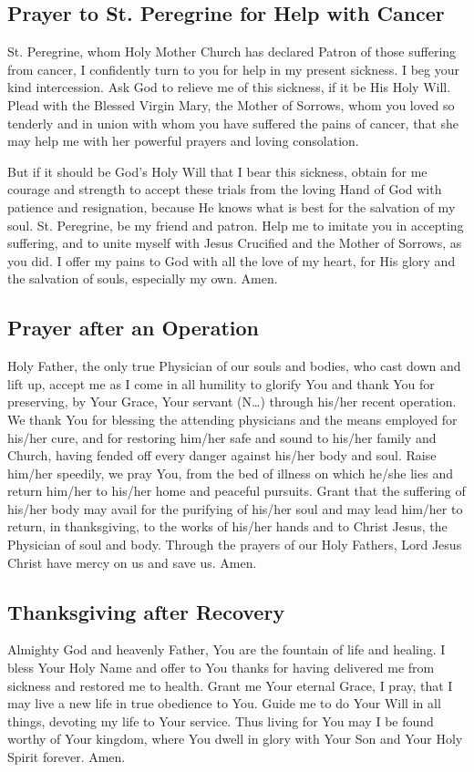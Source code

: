 \documentclass[12pt]{article}
\newcommand{\prayertitle}[1]{\subsection{#1}}
\newcommand{\insertname}{(N\dots)\xspace}
\begin{document}
\prayertitle{Prayer to St. Peregrine for Help with Cancer}
St. Peregrine, whom Holy Mother Church has declared Patron of those suffering from cancer, I confidently turn to you for help in my present sickness.
I beg your kind intercession.
Ask God to relieve me of this sickness, if it be His Holy Will.
Plead with the Blessed Virgin Mary, the Mother of Sorrows, whom you loved so tenderly and in union with whom you have suffered the pains of cancer, that she may help me with her powerful prayers and loving consolation.

But if it should be God's Holy Will that I bear this sickness, obtain for me courage and strength to accept these trials from the loving Hand of God with patience and resignation, because He knows what is best for the salvation of my soul.
St. Peregrine, be my friend and patron.
Help me to imitate you in accepting suffering, and to unite myself with Jesus Crucified and the Mother of Sorrows, as you did.
I offer my pains to God with all the love of my heart, for His glory and the salvation of souls, especially my own.
Amen.

\prayertitle{Prayer after an Operation}
Holy Father, the only true Physician of our souls and bodies, who cast down and lift up, accept me as I come in all humility to glorify You and thank You for preserving, by Your Grace, Your servant \insertname through his/her recent operation.
We thank You for blessing the attending physicians and the means employed for his/her cure, and for restoring him/her safe and sound to his/her family and Church, having fended off every danger against his/her body and soul.
Raise him/her speedily, we pray You, from the bed of illness on which he/she lies and return him/her to his/her home and peaceful pursuits.
Grant that the suffering of his/her body may avail for the purifying of his/her soul and may lead him/her to return, in thanksgiving, to the works of his/her hands and to Christ Jesus, the Physician of soul and body.
Through the prayers of our Holy Fathers, Lord Jesus Christ have mercy on us and save us.
Amen.

\prayertitle{Thanksgiving after Recovery}
Almighty God and heavenly Father, You are the fountain of life and healing.
I bless Your Holy Name and offer to You thanks for having delivered me from sickness and restored me to health.
Grant me Your eternal Grace, I pray, that I may live a new life in true obedience to You.
Guide me to do Your Will in all things, devoting my life to Your service.
Thus living for You may I be found worthy of Your kingdom, where You dwell in glory with Your Son and Your Holy Spirit forever.
Amen.
\end{document}
